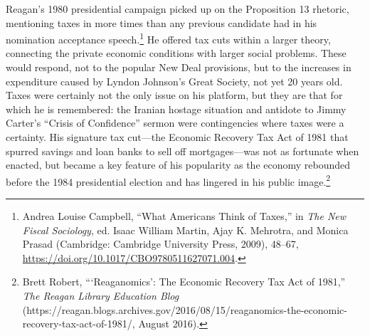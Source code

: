 \documentclass[12pt,oneside]{psthesis}
\begin{document}
Reagan's 1980 presidential campaign picked up on the Proposition 13 rhetoric, mentioning taxes in more times than any previous candidate had in his nomination acceptance speech.\footnote{Andrea Louise Campbell, ``What Americans Think of Taxes,'' in \emph{The New Fiscal Sociology}, ed. Isaac William Martin, Ajay K. Mehrotra, and Monica Prasad (Cambridge: Cambridge University Press, 2009), 48--67, \url{https://doi.org/10.1017/CBO9780511627071.004}.}
He offered tax cuts within a larger theory, connecting the private economic conditions with larger social problems.
These would respond, not to the popular New Deal provisions, but to the increases in expenditure caused by Lyndon Johnson's Great Society, not yet 20 years old.
Taxes were certainly not the only issue on his platform, but they are that for which he is remembered: the Iranian hostage situation and antidote to Jimmy Carter's ``Crisis of Confidence'' sermon were contingencies where taxes were a certainty.
His signature tax cut---the Economic Recovery Tax Act of 1981 that spurred savings and loan banks to sell off mortgages---was not as fortunate when enacted, but became a key feature of his popularity as the economy rebounded before the 1984 presidential election and has lingered in his public image.\footnote{Brett Robert, ```Reaganomics': The Economic Recovery Tax Act of 1981,'' \emph{The Reagan Library Education Blog} (https://reagan.blogs.archives.gov/2016/08/15/reaganomics-the-economic-recovery-tax-act-of-1981/, August 2016).}
\end{document}
